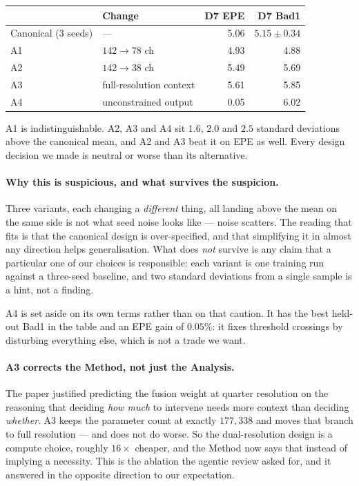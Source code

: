 \documentclass[11pt,a4paper]{article}
\begin{document}
\begin{center}
\footnotesize
\begin{tabular}{@{}llrr@{}}
\toprule
& Change & D7 EPE & D7 Bad1 \\
\midrule
Canonical (3 seeds) & --- & 5.06 & $5.15\pm0.34$ \\
A1 & $142\rightarrow78$ ch & 4.93 & 4.88 \\
A2 & $142\rightarrow38$ ch & 5.49 & 5.69 \\
A3 & full-resolution context & 5.61 & 5.85 \\
A4 & unconstrained output & 0.05 & 6.02 \\
\bottomrule
\end{tabular}
\end{center}

A1 is indistinguishable. A2, A3 and A4 sit $1.6$, $2.0$ and $2.5$
standard deviations above the canonical mean, and A2 and A3 beat it on
EPE as well. Every design decision we made is neutral or worse than its
alternative.

\paragraph{Why this is suspicious, and what survives the suspicion.}
Three variants, each changing a \emph{different} thing, all landing above
the mean on the same side is not what seed noise looks like --- noise
scatters. The reading that fits is that the canonical design is
over-specified, and that simplifying it in almost any direction helps
generalisation. What does \emph{not} survive is any claim that a
particular one of our choices is responsible: each variant is one
training run against a three-seed baseline, and two standard deviations
from a single sample is a hint, not a finding.

A4 is set aside on its own terms rather than on that caution. It has the
best held-out Bad1 in the table and an EPE gain of $0.05\%$: it fixes
threshold crossings by disturbing everything else, which is not a
trade we want.

\paragraph{A3 corrects the Method, not just the Analysis.} The paper
justified predicting the fusion weight at quarter resolution on the
reasoning that deciding \emph{how much} to intervene needs more context
than deciding \emph{whether}. A3 keeps the parameter count at exactly
$177{,}338$ and moves that branch to full resolution --- and does not do
worse. So the dual-resolution design is a compute choice, roughly
$16\times$ cheaper, and the Method now says that instead of implying a
necessity. This is the ablation the agentic review asked for, and it
answered in the opposite direction to our expectation.
\end{document}
